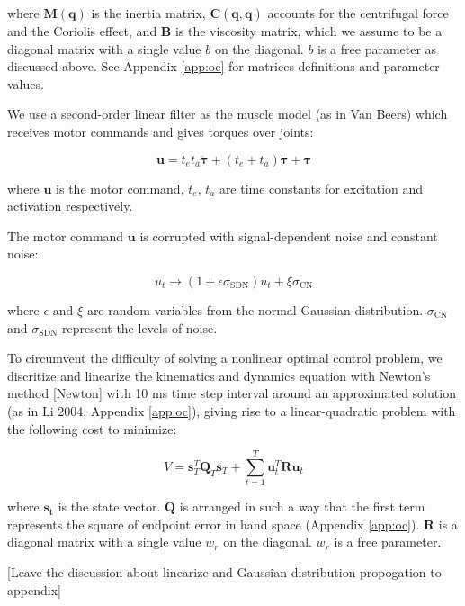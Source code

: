 where $\bm{M}(\bm{q})$ is the inertia matrix, $\bm{C}(\bm{q}, \dot{\bm{q}})$ accounts for the centrifugal force and the Coriolis effect, and $\bm{B}$ is the viscosity matrix, which we assume to be a diagonal matrix with a single value $b$ on the diagonal. $b$ is a free parameter as discussed above. 
See Appendix \ref{app:oc} for matrices definitions and parameter values.

We use a second-order linear filter as the muscle model (as in Van Beers) which receives motor commands and gives torques over joints:

\begin{equation}
	\bm{u} = t_et_a\ddot{\bm{\tau}} + (t_e+t_a)\dot{\bm{\tau}} +\bm{\tau}
\end{equation}

where $\bm{u}$ is the motor command, $t_e$, $t_a$ are time constants for excitation and activation respectively. 

The motor command $\bm{u}$ is corrupted with signal-dependent noise and constant noise:

\begin{equation}\label{cnsdn}
u_t \rightarrow (1 + \epsilon\sigma_{\text{SDN}}) u_t + \xi\sigma_{\text{CN}}
\end{equation}

where $\epsilon$ and $\xi$ are random variables from the normal Gaussian distribution.
$\sigma_{\text{CN}}$ and $\sigma_{\text{SDN}}$ represent the levels of noise.

To circumvent the difficulty of solving a nonlinear optimal control problem, we discritize and linearize the kinematics and dynamics equation with Newton's method [Newton] with 10 ms time step interval around an approximated solution (as in Li 2004, Appendix \ref{app:oc}), giving rise to a linear-quadratic problem with the following cost to minimize:

\begin{equation}
V = \bm{s}_T^T\bm{Q}_T\bm{s}_T + \sum_{t=1}^T\bm{u}_t^T\bm{Ru}_t
\end{equation}

where $\bm{s_t}$ is the state vector. 
$\bm{Q}$ is arranged in such a way that the first term represents the square of endpoint error in hand space (Appendix \ref{app:oc}). 
$\bm{R}$ is a diagonal matrix with a single value $w_r$ on the diagonal.
$w_r$ is a free parameter.

[Leave the discussion about linearize and Gaussian distribution propogation to appendix]



